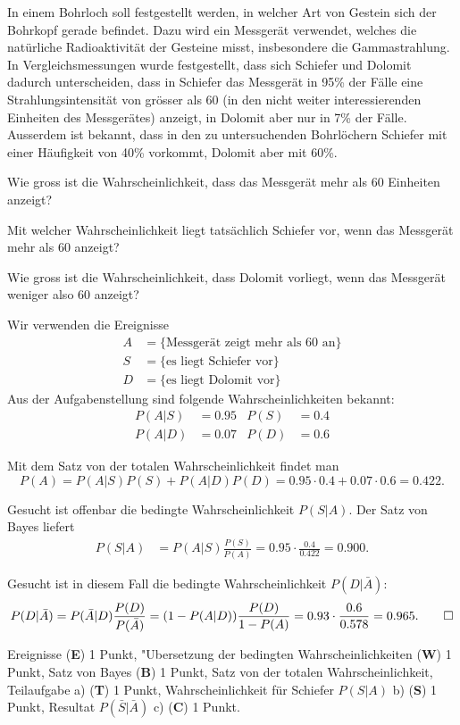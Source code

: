 In einem Bohrloch soll festgestellt werden, in welcher Art von Gestein
sich der Bohrkopf gerade befindet. Dazu wird ein Messgerät verwendet, welches
die natürliche Radioaktivität der Gesteine misst, insbesondere die
Gammastrahlung.
In Vergleichsmessungen wurde festgestellt, dass sich Schiefer
und Dolomit dadurch unterscheiden, dass in Schiefer das Messgerät
in 95\% der Fälle eine Strahlungsintensität von grösser als 60 (in den
nicht weiter interessierenden Einheiten des Messgerätes) anzeigt,
in Dolomit aber nur in 7\% der Fälle.
Ausserdem ist bekannt, dass in den zu untersuchenden Bohrlöchern
Schiefer mit einer Häufigkeit von 40\% vorkommt, Dolomit aber mit 60\%.
\begin{teilaufgaben}
\item
Wie gross ist die Wahrscheinlichkeit, dass das Messgerät mehr als 60
Einheiten anzeigt?
\item
Mit welcher Wahrscheinlichkeit liegt tatsächlich Schiefer vor, wenn 
das Messgerät mehr als 60 anzeigt?
\item
Wie gross ist die Wahrscheinlichkeit, dass Dolomit vorliegt, wenn
das Messgerät weniger also 60 anzeigt?
\end{teilaufgaben}


\begin{loesung}
Wir verwenden die Ereignisse
\begin{align*}
A&=\{\text{Messgerät zeigt mehr als 60 an}\}\\
S&=\{\text{es liegt Schiefer vor}\}\\
D&=\{\text{es liegt Dolomit vor}\}
\end{align*}
Aus der Aufgabenstellung sind folgende Wahrscheinlichkeiten bekannt:
\begin{align*}
P(A|S)&=0.95&
P(S)&=0.4\\
P(A|D)&=0.07&
P(D)&=0.6
\end{align*}
\begin{teilaufgaben}
\item Mit dem Satz von der totalen Wahrscheinlichkeit findet man
\[
P(A)=P(A|S)P(S)+P(A|D)P(D)=0.95\cdot 0.4+0.07\cdot 0.6=0.422.
\]
\item Gesucht ist offenbar die bedingte Wahrscheinlichkeit $P(S|A)$. Der
Satz von Bayes liefert
\begin{align*}
P(S|A)&=P(A|S)\frac{P(S)}{P(A)}=0.95\cdot\frac{0.4}{0.422}=0.900.
\end{align*}
\item
Gesucht ist in diesem Fall die bedingte Wahrscheinlichkeit $P(D|\bar A)$:
\[
P(D|\bar A)=P(\bar A|D)\frac{P(D)}{P(\bar A)}
=(1-P(A|D))\frac{P(D)}{1-P(A)}=0.93 \cdot \frac{0.6}{0.578}=0.965.
\qedhere
\]
\end{teilaufgaben}
\end{loesung}


\begin{bewertung}
Ereignisse ({\bf E}) 1 Punkt,
"Ubersetzung der bedingten Wahrscheinlichkeiten ({\bf W}) 1 Punkt,
Satz von Bayes ({\bf B}) 1 Punkt,
Satz von der totalen Wahrscheinlichkeit, Teilaufgabe a) ({\bf T}) 1 Punkt,
Wahrscheinlichkeit für Schiefer $P(S|A)$ b) ({\bf S}) 1 Punkt,
Resultat $P(\bar S|\bar A)$ c) ({\bf C}) 1 Punkt.
\end{bewertung}


